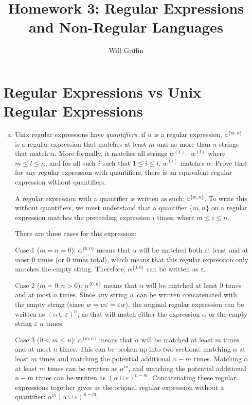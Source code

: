 \documentclass{article}
\title{Homework 3: Regular Expressions and Non-Regular Languages}
\author{Will Griffin}
\begin{document}
    \maketitle

    \section{Regular Expressions vs Unix Regular Expressions} 
        \begin{enumerate}[(a)]
            \item Unix regular expressions have \textit{quantifiers}: if $\alpha$ is a regular expression, $a^{\{m, n\}}$ is a regular expression that matches at least $m$ and no more than $n$ strings that match $\alpha$. More formally, it matches all strings $w^{(1)} \cdots w^{(l)}$ where $m \le l \le n$, and for all such $i$ such that $1 \le i \le l$, $w^{(i)}$ matches $\alpha$. Prove that for any regular expression with quantifiers, there is an equivalent regular expression without quantifiers.

                A regular expression with a quantifier is written as such: $a^{\{m, n\}}$. To write this without quantifiers, we must understand that a quantifier $\{m, n\}$ on a regular expression matches the preceeding expression $i$ times, where $m \le i \le n$.

                There are three cases for this expression: 

                Case 1 ($m = n = 0$): $\alpha^{\{0, 0\}}$ means that $\alpha$ will be matched both at least and at most 0 times (or 0 times total), which means that this regular expression only matches the empty string. Therefore, $\alpha^{\{0, 0\}}$ can be written as $\varepsilon$.

                Case 2 ($m = 0, n > 0$): $\alpha^{\{0, n\}}$ means that $\alpha$ will be matched at least 0 times and at most $n$ times. Since any string $w$ can be written concatenated with the empty string (since $w = w \varepsilon = \varepsilon w$), the original regular expression can be written as $(\alpha \cup \varepsilon)^n$, as that will match either the expression $\alpha$ or the empty string $\varepsilon$ $n$ times.

                Case 3 ($0 < m \le n$): $\alpha^{\{m, n\}}$ means that $\alpha$ will be matched at least $m$ times and at most $n$ times. This can be broken up into two sections: matching $\alpha$ at least $m$ times and matching the potential additional $n-m$ times. Matching $\alpha$ at least $m$ times can be written as $\alpha^m$, and matching the potential additional $n-m$ times can be written as $(\alpha \cup \varepsilon)^{n-m}$. Concatenating these regular expressions together gives us the original regular expression without a quantifier: $\alpha^m (\alpha \cup \varepsilon)^{n-m}$.


\end{enumerate}
\end{document}

